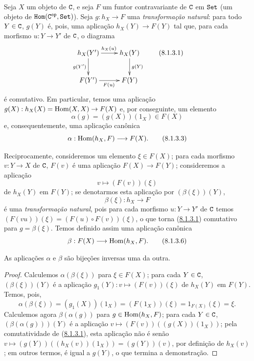 \begin{env}[8.1.3]
\label{0.8.1.3}
Seja $X$ um objeto de $\mathtt{C}$, e seja $F$ um funtor contravariante de $\mathtt{C}$ em $\mathtt{Set}$
(um objeto de $\mathtt{Hom}(\mathtt{C}^\mathtt{op},\mathtt{Set})$). Seja $g:h_X\to F$ uma \emph{transformação natural}: para todo $Y\in\mathtt{C}$,
$g(Y)$ é, pois, uma aplicação $h_X(Y)\to F(Y)$ tal que, para cada morfismo $u:Y\to Y'$ de $\mathtt{C}$,
o diagrama
\[
  \xymatrix{
    h_X(Y')\ar[r]^{h_X(u)}\ar[d]_{g(Y')} &
    h_X(Y)\ar[d]^{g(Y)}\\
    F(Y')\ar[r]_{F(u)} &
    F(Y)
  }
  \tag{8.1.3.1}\label{0.8.1.3.1}
\]
é comutativo. Em particular, temos uma aplicação $g(X):h_X(X)=\Hom(X,X)\to F(X)$ e, por conseguinte, um elemento
\[
  \alpha(g)=(g(X))(1_X)\in F(X)
  \tag{8.1.3.2}
\]
e, consequentemente, uma aplicação canônica
\[
  \alpha:\Hom(h_X,F)\to F(X).
  \tag{8.1.3.3}
\]

Reciprocamente, consideremos um elemento $\xi\in F(X)$; para cada morfismo $v:Y\to X$ de $\mathtt{C}$, $F(v)$ é uma
aplicação $F(X)\to F(Y)$; consideremos a aplicação
\[
  v\mapsto(F(v))(\xi)
  \tag{8.1.3.4}
\]
de $h_X(Y)$ em $F(Y)$; se denotarmos esta aplicação por $(\beta(\xi))(Y)$,
\[
  \beta(\xi):h_X\to F
  \tag{8.1.3.5}
\]
é uma \emph{transformação natural}, pois para cada morfismo $u:Y\to Y'$ de $\mathtt{C}$ temos
$(F(vu))(\xi)=(F(u)\circ F(v))(\xi)$, o que torna (\hyperref[0.8.1.3.1]{8.1.3.1}) comutativo para $g=\beta(\xi)$.
Temos definido assim uma aplicação canônica
\[
  \beta:F(X)\to\Hom(h_X,F).
  \tag{8.1.3.6}
\]
\end{env}

\begin{proposition}[8.1.4]
\label{0.8.1.4}
As aplicações $\alpha$ e $\beta$ são bijeções inversas uma da outra.
\end{proposition}

\begin{proof}
Calculemos $\alpha(\beta(\xi))$ para $\xi\in F(X)$; para cada $Y\in\mathtt{C}$, $(\beta(\xi))(Y)$ é a aplicação
$g_1(Y):v\mapsto(F(v))(\xi)$ de $h_X(Y)$ em $F(Y)$. Temos, pois,
\[
  \alpha(\beta(\xi))=(g_1(X))(1_X)=(F(1_X))(\xi)=1_{F(X)}(\xi)=\xi.
\]
Calculemos agora $\beta(\alpha(g))$ para $g\in\operatorname{Hom}(h_X,F)$; para cada $Y\in\mathtt{C}$, $(\beta(\alpha(g)))(Y)$
é a aplicação $v\mapsto(F(v))((g(X))(1_X))$; pela comutatividade de (\hyperref[0.8.1.3.1]{8.1.3.1}), esta aplicação
não é senão $v\mapsto(g(Y))((h_X(v))(1_X))=(g(Y))(v)$, por definição de $h_X(v)$; em outros termos,
é igual a $g(Y)$, o que termina a demonstração.
\end{proof}

